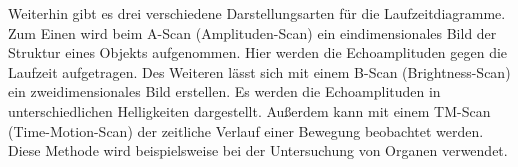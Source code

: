 Weiterhin gibt es drei verschiedene Darstellungsarten für die Laufzeitdiagramme.
Zum Einen wird beim A-Scan (Amplituden-Scan) ein eindimensionales Bild der Struktur eines
Objekts aufgenommen. Hier werden die Echoamplituden gegen die Laufzeit aufgetragen. Des Weiteren
lässt sich mit einem B-Scan (Brightness-Scan) ein zweidimensionales Bild erstellen. Es werden
die Echoamplituden in unterschiedlichen Helligkeiten dargestellt.
Außerdem kann mit einem TM-Scan (Time-Motion-Scan) der zeitliche Verlauf einer Bewegung
beobachtet werden. Diese Methode wird beispielsweise bei der Untersuchung von Organen verwendet.
\FloatBarrier
